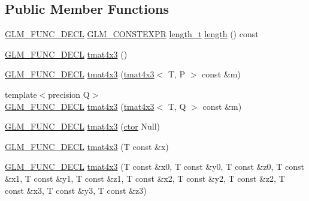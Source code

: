 \subsection*{Public Member Functions}
\begin{DoxyCompactItemize}
\item 
\hyperlink{setup_8hpp_ab2d052de21a70539923e9bcbf6e83a51}{G\+L\+M\+\_\+\+F\+U\+N\+C\+\_\+\+D\+E\+CL} \hyperlink{setup_8hpp_a08b807947b47031d3a511f03f89645ad}{G\+L\+M\+\_\+\+C\+O\+N\+S\+T\+E\+X\+PR} \hyperlink{namespaceglm_a090a0de2260835bee80e71a702492ed9}{length\+\_\+t} \hyperlink{structglm_1_1detail_1_1tmat4x3_a90955b2119eda5dcb628ad5b4fbd240b}{length} () const
\item 
\hyperlink{setup_8hpp_ab2d052de21a70539923e9bcbf6e83a51}{G\+L\+M\+\_\+\+F\+U\+N\+C\+\_\+\+D\+E\+CL} \hyperlink{structglm_1_1detail_1_1tmat4x3_a51a17cc460442ce38d5484c5a0150ecf}{tmat4x3} ()
\item 
\hyperlink{setup_8hpp_ab2d052de21a70539923e9bcbf6e83a51}{G\+L\+M\+\_\+\+F\+U\+N\+C\+\_\+\+D\+E\+CL} \hyperlink{structglm_1_1detail_1_1tmat4x3_ae77cc858418c288537a65d74d891bf00}{tmat4x3} (\hyperlink{structglm_1_1detail_1_1tmat4x3}{tmat4x3}$<$ T, P $>$ const \&m)
\item 
{\footnotesize template$<$precision Q$>$ }\\\hyperlink{setup_8hpp_ab2d052de21a70539923e9bcbf6e83a51}{G\+L\+M\+\_\+\+F\+U\+N\+C\+\_\+\+D\+E\+CL} \hyperlink{structglm_1_1detail_1_1tmat4x3_a5fcf4eb115cbf03560ab19f4673f9b3c}{tmat4x3} (\hyperlink{structglm_1_1detail_1_1tmat4x3}{tmat4x3}$<$ T, Q $>$ const \&m)
\item 
\hyperlink{setup_8hpp_ab2d052de21a70539923e9bcbf6e83a51}{G\+L\+M\+\_\+\+F\+U\+N\+C\+\_\+\+D\+E\+CL} \hyperlink{structglm_1_1detail_1_1tmat4x3_abcb7184aeb3a229850057e6bbdb81030}{tmat4x3} (\hyperlink{structglm_1_1detail_1_1tmat4x3_ac17f13b8e4946fda04e2c86b280491fe}{ctor} Null)
\item 
\hyperlink{setup_8hpp_ab2d052de21a70539923e9bcbf6e83a51}{G\+L\+M\+\_\+\+F\+U\+N\+C\+\_\+\+D\+E\+CL} \hyperlink{structglm_1_1detail_1_1tmat4x3_a2d1e973fa0706ef8e0fffa4ee23712ab}{tmat4x3} (T const \&x)
\item 
\hyperlink{setup_8hpp_ab2d052de21a70539923e9bcbf6e83a51}{G\+L\+M\+\_\+\+F\+U\+N\+C\+\_\+\+D\+E\+CL} \hyperlink{structglm_1_1detail_1_1tmat4x3_ae83188b56015ab7922dd9827a8795f65}{tmat4x3} (T const \&x0, T const \&y0, T const \&z0, T const \&x1, T const \&y1, T const \&z1, T const \&x2, T const \&y2, T const \&z2, T const \&x3, T const \&y3, T const \&z3)
\item 

\end{DoxyCompactItemize}
